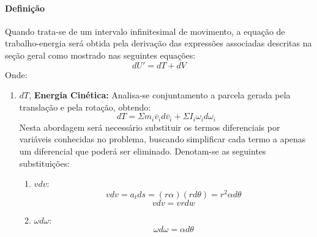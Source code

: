 \documentclass{article}
\begin{document}
            \paragraph{Definição}Quando trata-se de um intervalo infinitesimal de movimento, a equação de trabalho-energia será obtida pela derivação das expressões associadas descritas na seção geral como mostrado nas seguintes equações:
                \begin{equation}
                    \boxed{
                        dU' = dT + dV
                    }
                \end{equation}
            Onde:
                \begin{enumerate}[rightmargin = \leftmargin, noitemsep]
                    \item $dT$, \textbf{Energia Cinética:} Analisa-se conjuntamento a parcela gerada pela translação e pela rotação, obtendo:
                        \begin{equation}
                            \boxed{
                                dT = 
                                \Sigma m_{i}\overline{v}_{i}d\overline{v}_{i} +
                                \Sigma I_{i}\omega_{i}d\omega_{i}
                            }
                        \end{equation}
                    Nesta abordagem será necessário substituir os termos diferenciais por variáveis conhecidas no problema, buscando simplificar cada termo a apenas um diferencial que poderá ser eliminado. Denotam-se as seguintes substituições:
                        \begin{enumerate}[rightmargin = \leftmargin, noitemsep]
                            \item $vdv$:
                                \begin{equation}
                                    v dv = 
                                    a_{t} ds = 
                                    (r \alpha)(r d\theta) = 
                                    r^{2} \alpha d\theta
                                \end{equation}
                                \begin{equation}
                                    v dv = 
                                    v r dw
                                \end{equation}

                            \item $\omega d\omega$:
                                \begin{equation}
                                    \omega d\omega = 
                                    \alpha d\theta
                                \end{equation}
                        \end{enumerate}


\end{enumerate}
\end{document}
